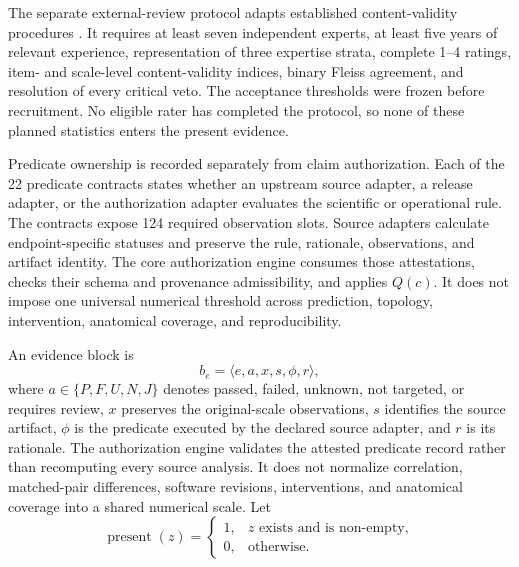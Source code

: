 The separate external-review protocol adapts established content-validity procedures \citep{lynn1986content,terwee2018cosmin}. It requires at least seven independent experts, at least five years of relevant experience, representation of three expertise strata, complete 1--4 ratings, item- and scale-level content-validity indices, binary Fleiss agreement, and resolution of every critical veto. The acceptance thresholds were frozen before recruitment. No eligible rater has completed the protocol, so none of these planned statistics enters the present evidence.

Predicate ownership is recorded separately from claim authorization. Each of the 22 predicate contracts states whether an upstream source adapter, a release adapter, or the authorization adapter evaluates the scientific or operational rule. The contracts expose 124 required observation slots. Source adapters calculate endpoint-specific statuses and preserve the rule, rationale, observations, and artifact identity. The core authorization engine consumes those attestations, checks their schema and provenance admissibility, and applies $Q(c)$. It does not impose one universal numerical threshold across prediction, topology, intervention, anatomical coverage, and reproducibility.

An evidence block is
\begin{equation}
b_e=\langle e,a,x,s,\phi,r\rangle,
\label{eq:evidence-block-v2}
\end{equation}
where $a\in\{P,F,U,N,J\}$ denotes passed, failed, unknown, not targeted, or requires review, $x$ preserves the original-scale observations, $s$ identifies the source artifact, $\phi$ is the predicate executed by the declared source adapter, and $r$ is its rationale. The authorization engine validates the attested predicate record rather than recomputing every source analysis. It does not normalize correlation, matched-pair differences, software revisions, interventions, and anatomical coverage into a shared numerical scale. Let
\begin{equation}
\operatorname{present}(z)=
\begin{cases}
1, & z\text{ exists and is non-empty},\\
0, & \text{otherwise}.
\end{cases}
\label{eq:field-presence}
\end{equation}

